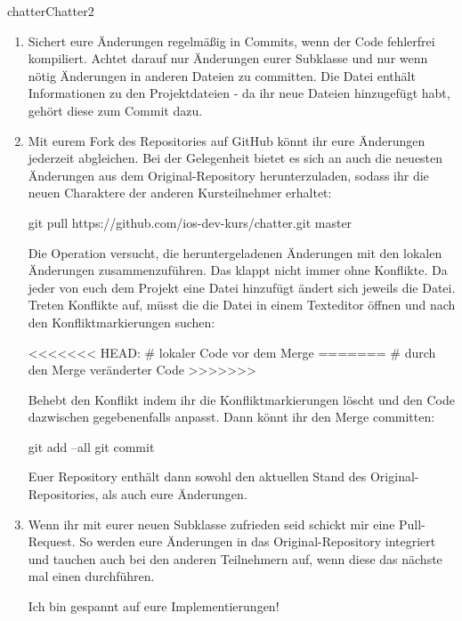 \documentclass[parskip=half, final]{scrreprt}
\begin{document}
\begin{lecture}
\begin{exc}
\begin{excitem}{chatter}{Chatter}{2}
\begin{enumerate}[label=\roman*.]
\item Sichert eure Änderungen regelmäßig in Commits, wenn der Code fehlerfrei kompiliert. Achtet darauf nur Änderungen eurer Subklasse und nur wenn nötig Änderungen in anderen Dateien zu committen. Die  Datei enthält Informationen zu den Projektdateien - da ihr neue Dateien hinzugefügt habt, gehört diese zum Commit dazu.

\item Mit eurem Fork des Repositories auf GitHub könnt ihr eure Änderungen jederzeit abgleichen. Bei der Gelegenheit bietet es sich an auch die neuesten Änderungen aus dem Original-Repository herunterzuladen, sodass ihr die neuen Charaktere der anderen Kursteilnehmer erhaltet:

\begin{shcode}
git pull https://github.com/ios-dev-kurs/chatter.git master
\end{shcode}

Die  Operation versucht, die heruntergeladenen Änderungen mit den lokalen Änderungen zusammenzuführen. Das klappt nicht immer ohne Konflikte. Da jeder von euch dem Projekt eine Datei hinzufügt ändert sich jeweils die  Datei. Treten Konflikte auf, müsst die die Datei in einem Texteditor öffnen und nach den Konfliktmarkierungen suchen:

\begin{shcode}
<<<<<<< HEAD:
# lokaler Code vor dem Merge
=======
# durch den Merge veränderter Code
>>>>>>>
\end{shcode}

Behebt den Konflikt indem ihr die Konfliktmarkierungen löscht und den Code dazwischen gegebenenfalls anpasst. Dann könnt ihr den Merge committen:

\begin{shcode}
git add --all
git commit
\end{shcode}

Euer Repository enthält dann sowohl den aktuellen Stand des Original-Repositories, als auch eure Änderungen.

\item Wenn ihr mit eurer neuen  Subklasse zufrieden seid schickt mir eine Pull-Request. So werden eure Änderungen in das Original-Repository integriert und tauchen auch bei den anderen Teilnehmern auf, wenn diese das nächste mal einen  durchführen.

Ich bin gespannt auf eure Implementierungen!


\end{enumerate}
\end{excitem}
\end{exc}
\end{lecture}
\end{document}
